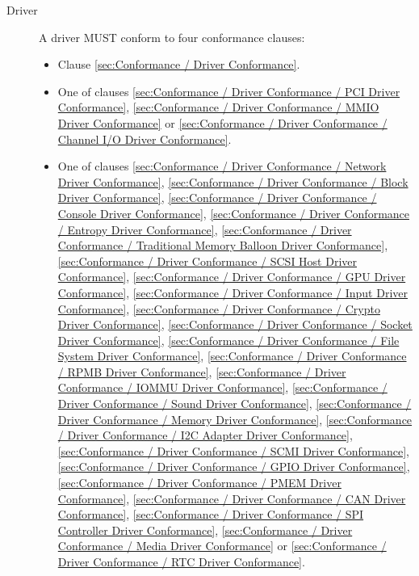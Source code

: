 \begin{description}
\item[Driver] A driver MUST conform to four conformance clauses:
  \begin{itemize}
    \item Clause \ref{sec:Conformance / Driver Conformance}.
    \item One of clauses \ref{sec:Conformance / Driver Conformance / PCI Driver Conformance}, \ref{sec:Conformance / Driver Conformance / MMIO Driver Conformance} or \ref{sec:Conformance / Driver Conformance / Channel I/O Driver Conformance}.
    \item One of clauses
\ref{sec:Conformance / Driver Conformance / Network Driver Conformance},
\ref{sec:Conformance / Driver Conformance / Block Driver Conformance},
\ref{sec:Conformance / Driver Conformance / Console Driver Conformance},
\ref{sec:Conformance / Driver Conformance / Entropy Driver Conformance},
\ref{sec:Conformance / Driver Conformance / Traditional Memory Balloon Driver Conformance},
\ref{sec:Conformance / Driver Conformance / SCSI Host Driver Conformance},
\ref{sec:Conformance / Driver Conformance / GPU Driver Conformance},
\ref{sec:Conformance / Driver Conformance / Input Driver Conformance},
\ref{sec:Conformance / Driver Conformance / Crypto Driver Conformance},
\ref{sec:Conformance / Driver Conformance / Socket Driver Conformance},
\ref{sec:Conformance / Driver Conformance / File System Driver Conformance},
\ref{sec:Conformance / Driver Conformance / RPMB Driver Conformance},
\ref{sec:Conformance / Driver Conformance / IOMMU Driver Conformance},
\ref{sec:Conformance / Driver Conformance / Sound Driver Conformance},
\ref{sec:Conformance / Driver Conformance / Memory Driver Conformance},
\ref{sec:Conformance / Driver Conformance / I2C Adapter Driver Conformance},
\ref{sec:Conformance / Driver Conformance / SCMI Driver Conformance},
\ref{sec:Conformance / Driver Conformance / GPIO Driver Conformance},
\ref{sec:Conformance / Driver Conformance / PMEM Driver Conformance},
\ref{sec:Conformance / Driver Conformance / CAN Driver Conformance},
\ref{sec:Conformance / Driver Conformance / SPI Controller Driver Conformance},
\ref{sec:Conformance / Driver Conformance / Media Driver Conformance} or
\ref{sec:Conformance / Driver Conformance / RTC Driver Conformance}.


\end{itemize}
\end{description}
